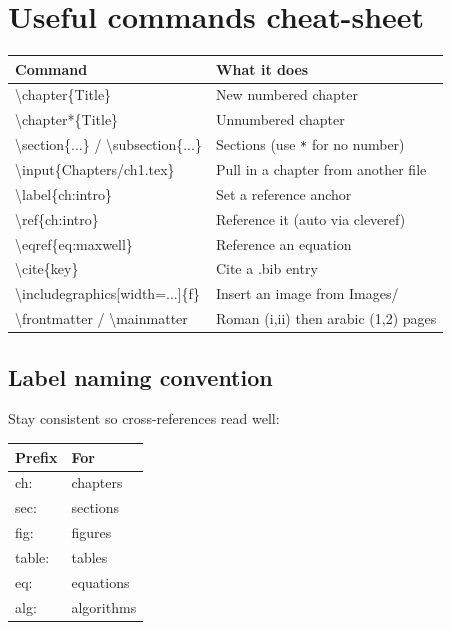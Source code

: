\documentclass[11pt]{article}
\begin{document}
\section{Useful commands cheat-sheet}

\begin{tabular}{@{}>{\ttfamily}p{} p{}@{}}
\toprule
\normalfont\textbf{Command} & \textbf{What it does} \\
\midrule
\textbackslash chapter\{Title\}              & New numbered chapter \\
\textbackslash chapter*\{Title\}             & Unnumbered chapter \\
\textbackslash section\{...\} / \textbackslash subsection\{...\} & Sections (use \texttt{*} for no number) \\
\textbackslash input\{Chapters/ch1.tex\}     & Pull in a chapter from another file \\
\textbackslash label\{ch:intro\}             & Set a reference anchor \\
\textbackslash ref\{ch:intro\}               & Reference it (auto via cleveref) \\
\textbackslash eqref\{eq:maxwell\}           & Reference an equation \\
\textbackslash cite\{key\}                    & Cite a .bib entry \\
\textbackslash includegraphics[width=...]\{f\} & Insert an image from Images/ \\
\textbackslash frontmatter / \textbackslash mainmatter & Roman (i,ii) then arabic (1,2) pages \\
\bottomrule
\end{tabular}

\subsection{Label naming convention}
Stay consistent so cross-references read well:

\begin{center}
\begin{tabular}{@{}>{\ttfamily}l l@{}}
\toprule
\normalfont\textbf{Prefix} & \textbf{For} \\
\midrule
ch:    & chapters \\
sec:   & sections \\
fig:   & figures \\
table: & tables \\
eq:    & equations \\
alg:   & algorithms \\
\bottomrule
\end{tabular}
\end{center}
\end{document}
